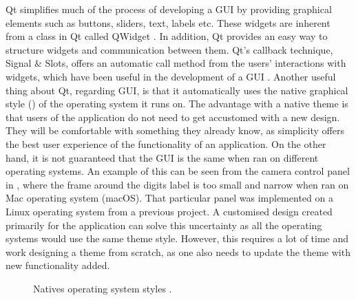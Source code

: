 Qt simplifies much of the process of developing a GUI by providing graphical elements such as buttons, sliders, text, labels etc. These widgets are inherent from a class in Qt called QWidget \cite{qwidget}. In addition, Qt provides an easy way to structure widgets and communication between them. Qt's callback technique, Signal \& Slots, offers an automatic call method from the users' interactions with widgets, which have been useful in the development of a GUI \cite{signalslots}. Another useful thing about Qt, regarding GUI, is that it automatically uses the native graphical style () of the operating system it runs on. The advantage with a native theme is that users of the application do not need to get accustomed with a new design. They will be comfortable with something they already know, as simplicity offers the best user experience of the functionality of an application. On the other hand, it is not guaranteed that the GUI is the same when ran on different operating systems. An example of this can be seen from the camera control panel in , where the frame around the digits label is too small and narrow when ran on Mac operating system (macOS). That particular panel was implemented on a Linux operating system from a previous project. A customised design created primarily for the application can solve this uncertainty as all the operating systems would use the same theme style. However, this requires a lot of time and work designing a theme from scratch, as one also needs to update the theme with new functionality added.

\begin{figure}[ht]
  \centering
  \hfill
  \hfill
  \caption[Native operating system styles \cite{qstyle}]{Natives operating system styles \cite{qstyle}.}
  \label{fig:qstyle}
\end{figure}


